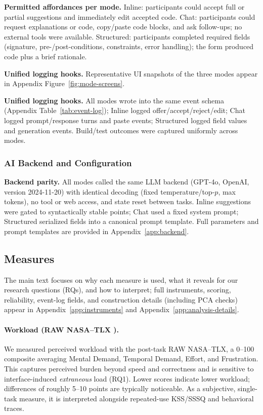 \documentclass[sigconf]{acmart}
\newcommand{\ModelName}{GPT-4o} %
\newcommand{\ModelProvider}{OpenAI}      %
\newcommand{\ModelVersion}{2024-11-20}         %
\begin{document}
\noindent\textbf{Permitted affordances per mode.}
Inline: participants could accept full or partial suggestions and immediately edit accepted code. 
Chat: participants could request explanations or code, copy/paste code blocks, and ask follow-ups; no external tools were available.
Structured: participants completed required fields (signature, pre-/post-conditions, constraints, error handling); the form produced code plus a brief rationale.

\noindent\textbf{Unified logging hooks.}
Representative UI snapshots of the three modes appear in Appendix Figure~\ref{fig:mode-screens}.

\noindent\textbf{Unified logging hooks.}
All modes wrote into the same event schema (Appendix Table~\ref{tab:event-log}); Inline logged offer/accept/reject/edit; Chat logged prompt/response turns and paste events; Structured logged field values and generation events. Build/test outcomes were captured uniformly across modes.

\subsubsection*{AI Backend and Configuration}
\label{sec:backend}

\noindent\textbf{Backend parity.}
All modes called the same LLM backend (\ModelName, \ModelProvider, version \ModelVersion) with identical decoding (fixed temperature/top-$p$, max tokens), no tool or web access, and state reset between tasks. Inline suggestions were gated to syntactically stable points; Chat used a fixed system prompt; Structured serialized fields into a canonical prompt template. Full parameters and prompt templates are provided in Appendix~\ref{app:backend}.

\subsection{Measures}
\label{sec:measures}

The main text focuses on why each measure is used, what it reveals for our research questions (RQs), and how to interpret; full instruments, scoring, reliability, event-log fields, and construction details (including PCA checks) appear in Appendix~\ref{app:instruments} and Appendix~\ref{app:analysis-details}.

\paragraph{Workload (RAW NASA--TLX \cite{hart2006nasa}).}
We measured perceived workload with the post-task RAW NASA--TLX, a 0--100 composite averaging Mental Demand, Temporal Demand, Effort, and Frustration. This captures perceived burden beyond speed and correctness and is sensitive to interface-induced \emph{extraneous} load (RQ1). Lower scores indicate lower workload; differences of roughly 5--10 points are typically noticeable. As a subjective, single-task measure, it is interpreted alongside repeated-use KSS/SSSQ and behavioral traces.
\end{document}
